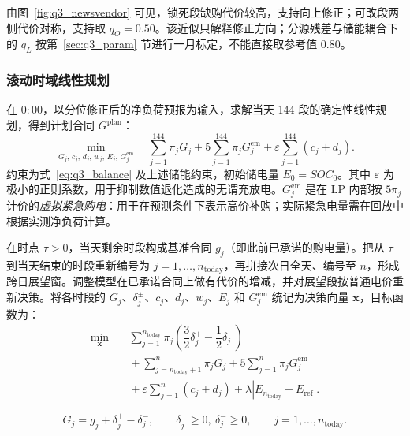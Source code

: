 由图~\ref{fig:q3_newsvendor} 可见，锁死段缺购代价较高，支持向上修正；可改段两侧代价对称，支持取 $q_O=0.50$。该近似只解释修正方向；分源残差与储能耦合下的 $q_L$ 按第~\ref{sec:q3_param} 节进行一月标定，不能直接取参考值 $0.80$。

\subsubsection{滚动时域线性规划}

在 $0{:}00$，以分位修正后的净负荷预报为输入，求解当天 144 段的确定性线性规划，得到计划合同 $G^{\mathrm{plan}}$：
\begin{equation}
  \min_{G_j,\,c_j,\,d_j,\,w_j,\,E_j,\,G^{\mathrm{em}}_j}\quad
  \sum_{j=1}^{144}\pi_j G_j
  +5\sum_{j=1}^{144}\pi_j G^{\mathrm{em}}_j
  +\varepsilon\sum_{j=1}^{144}(c_j+d_j).
  \label{eq:q3_lp0}
\end{equation}
约束为式~\eqref{eq:q3_balance} 及上述储能约束，初始储电量 $E_0=SOC_0$。其中 $\varepsilon$ 为极小的正则系数，用于抑制数值退化造成的无谓充放电。$G^{\mathrm{em}}_j$ 是在 LP 内部按 $5\pi_j$ 计价的\emph{虚拟紧急购电}：用于在预测条件下表示高价补购；实际紧急电量需在回放中根据实测净负荷计算。

在时点 $\tau>0$，当天剩余时段构成基准合同 $g_j$（即此前已承诺的购电量）。把从 $\tau$ 到当天结束的时段重新编号为 $j=1,\dots,n_{\mathrm{today}}$，再拼接次日全天、编号至 $n$，形成跨日展望窗。调整模型在已承诺合同上做有代价的增减，并对展望段按普通电价重新决策。将各时段的 $G_j$、$\delta_j^{\pm}$、$c_j$、$d_j$、$w_j$、$E_j$ 和 $G_j^{\mathrm{em}}$ 统记为决策向量 $\boldsymbol{x}$，目标函数为：
\begin{equation}
\begin{aligned}
\min_{\boldsymbol{x}}\quad
& \sum_{j=1}^{n_{\mathrm{today}}}\pi_j
  \left(
    \dfrac{3}{2}\delta_j^{+}
    -\dfrac{1}{2}\delta_j^{-}
  \right) \\[5pt]
& {}+\sum_{j=n_{\mathrm{today}}+1}^{n}\pi_j G_j
  +5\sum_{j=1}^{n}\pi_j G_j^{\mathrm{em}} \\[5pt]
& {}+\varepsilon\sum_{j=1}^{n}(c_j+d_j)
  +\lambda\left|E_{n_{\mathrm{today}}}-E_{\mathrm{ref}}\right|.
\end{aligned}
\label{eq:q3_lp_adj}
\end{equation}

\begin{equation}
  G_j=g_j+\delta^{+}_j-\delta^{-}_j,\qquad \delta^{+}_j\ge 0,\ \delta^{-}_j\ge 0,\qquad j=1,\dots,n_{\mathrm{today}}.
  \label{eq:q3_adj_rel}
\end{equation}

